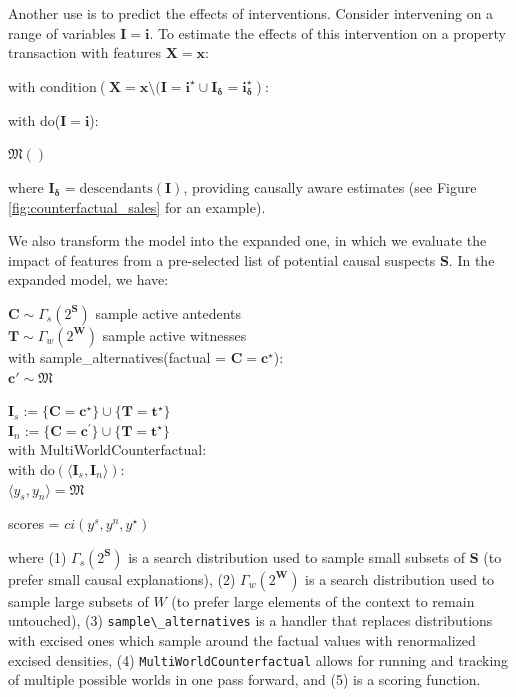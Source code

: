 \documentclass[twoside,11pt]{article}
\renewcommand{\texttt}[1]{\lstinline[basicstyle=\fontsize{8pt}{8.25pt}\selectfont\ttfamily]{#1}}
\begin{document}
Another use is to predict the effects of interventions. Consider intervening on a range of variables
$\mathbf{I}= \mathbf{i}$. To estimate the effects of this intervention on a property transaction with features
$\mathbf{X=x}$:
\begin{docode}
with condition$\left( \mathbf{X}= \mathbf{x} \setminus (\mathbf{I}= \mathbf{i^\star} \cup  \mathbf{I_\delta}   = \mathbf{i_\delta^\star}\right):$

\hspace*{2em}  with do($\mathbf{I}=\mathbf{i}$):

  \hspace*{5em} $\mathfrak{M}()$
\end{docode}
\noindent where  $\mathbf{I_\delta} = \mathrm{descendants}(\mathbf{I})$, providing causally aware estimates  (see Figure \ref{fig:counterfactual_sales} for an example).

We also transform the model into the expanded one, in which we evaluate the impact of features from a pre-selected list of potential causal suspects $\mathbf{S}$. In the expanded model, we have:
\begin{docode}
$\mathbf{C} \sim \Gamma_s(2^\mathbf{S})$   sample active antedents \\
$\mathbf{T} \sim \Gamma_w(2^\mathbf{W})$ sample active witnesses \\
with sample\_alternatives(factual = $\mathbf{C} = \mathbf{c^\star}$): \\
\hspace*{2em} $\mathbf{c'} \sim \mathfrak{M}$

\vspace{2mm}

$\mathbf{I}_s   := \{\mathbf{C} = \mathbf{c^\star}\} \cup \{ \mathbf{T} = \mathbf{t^\star}\}$ \\
$\mathbf{I}_n := \{ \mathbf{C} = \mathbf{c^{\prime}} \} \cup \{ \mathbf{T} = \mathbf{t^{\star}} \}$ \\

with MultiWorldCounterfactual: \\
\hspace*{2em}  with do$\left( \langle \mathbf{I}_s, \mathbf{I}_n \rangle \right) $: \\
\hspace*{4em} $\langle y_s, y_n \rangle = \mathfrak{M}$

\vspace{2mm}

scores = $ci(y^s, y^n, y^\star)$

\end{docode}
\noindent where (1) $\Gamma_s(2^\mathbf{S})$ is a search distribution used to sample small subsets of $\mathbf{S}$ (to prefer small causal explanations), 
(2) $\Gamma_w(2^\mathbf{W})$ is a search distribution used to sample large subsets of $W$ (to prefer large elements of the context to remain untouched), (3) \texttt{sample\_alternatives} is a handler that replaces distributions with excised ones which sample around the factual values with renormalized excised densities, (4) \texttt{MultiWorldCounterfactual} allows for running and tracking of multiple possible worlds in one pass forward, and (5) is a scoring function.
\end{document}
